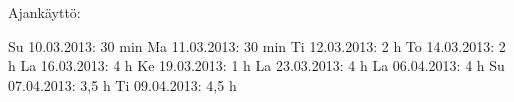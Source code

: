 Ajankäyttö:

Su 10.03.2013: 30 min
Ma 11.03.2013: 30 min
Ti 12.03.2013: 2 h
To 14.03.2013: 2 h
La 16.03.2013: 4 h
Ke 19.03.2013: 1 h
La 23.03.2013: 4 h
La 06.04.2013: 4 h
Su 07.04.2013: 3,5 h
Ti 09.04.2013: 4,5 h
